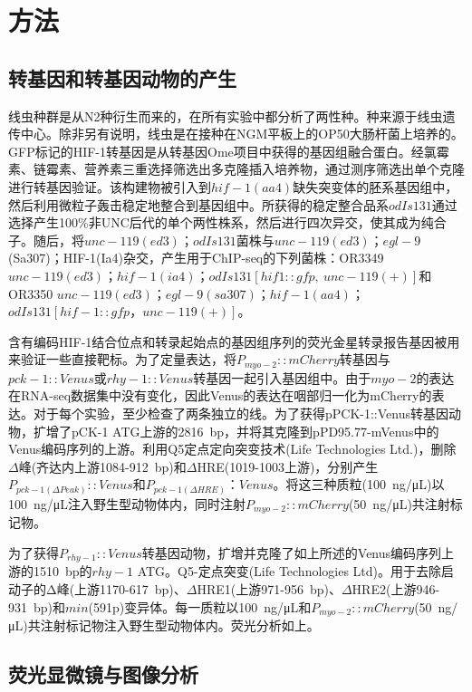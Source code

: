 \documentclass{ctexart}
\begin{document}
    \section{方法}

    \subsection{转基因和转基因动物的产生}

        线虫种群是从N2种衍生而来的，在所有实验中都分析了两性种。种来源于线虫遗传中心。除非另有说明，线虫是在接种在NGM平板上的OP50大肠杆菌上培养的。GFP标记的HIF-1转基因是从转基因Ome项目中获得的基因组融合蛋白。经氯霉素、链霉素、营养素三重选择筛选出多克隆插入培养物，通过测序筛选出单个克隆进行转基因验证。该构建物被引入到$hif-1(aa4)$缺失突变体的胚系基因组中，然后利用微粒子轰击稳定地整合到基因组中。所获得的稳定整合品系$odIs131$通过选择产生100\%非UNC后代的单个两性株系，然后进行四次异交，使其成为纯合子。随后，将$unc-119(ed3)$；$odIs131$菌株与$unc-119(ed3)$；$egl-9$(Sa307)；HIF-1(Ia4)杂交，产生用于ChIP-seq的下列菌株：OR3349 $unc-119(ed3)$；$hif-1(ia4)$；$odIs131[hif1::gfp,~unc-119(+)]$和OR3350 $unc-119(ed3)$；$egl-9(sa307)$；$hif-1(aa4)$；$odIs131[hif-1::gfp，unc-119(+)]$。

        含有编码HIF-1结合位点和转录起始点的基因组序列的荧光金星转录报告基因被用来验证一些直接靶标。为了定量表达，将$P_{myo-2}::mCherry$转基因与$pck-1::Venus$或$rhy-1::Venus$转基因一起引入基因组中。由于$myo-2$的表达在RNA-seq数据集中没有变化，因此Venus的表达在咽部归一化为mCherry的表达。对于每个实验，至少检查了两条独立的线。为了获得pPCK-1::Venus转基因动物，扩增了pCK-1 ATG上游的2816~bp，并将其克隆到pPD95.77-mVenus中的Venus编码序列的上游。利用Q5定点定向突变技术(Life Technologies Ltd.)，删除$\Delta$峰(齐达内上游1084-912~bp)和$\Delta$HRE(1019-1003上游)，分别产生$P_{pck-1(\Delta Peak)}::Venus$和$P_{pck-1(\Delta HRE)}：Venus$。将这三种质粒(100~ng/μL)以100~ng/μL注入野生型动物体内，同时注射$P_{myo-2}::mCherry$(50~ng/μL)共注射标记物。

        为了获得$P_{rhy-1}::Venus$转基因动物，扩增并克隆了如上所述的Venus编码序列上游的1510~bp的$rhy-1$ ATG。Q5-定点突变(Life Technologies Ltd)。用于去除启动子的Δ峰(上游1170-617~bp)、$\Delta$HRE1(上游971-956~bp)、$\Delta$HRE2(上游946-931~bp)和$min$(591p)变异体。每一质粒以100~ng/μL和$P_{myo-2}::mCherry$(50~ng/μL)共注射标记物注入野生型动物体内。荧光分析如上。

    \subsection{荧光显微镜与图像分析}
\end{document}
